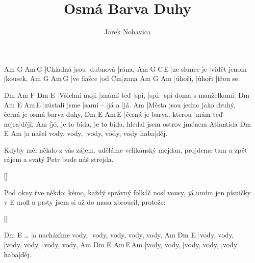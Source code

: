 \documentclass{song}
\author{Jarek Nohavica}
\title{Osmá Barva Duhy}
\begin{document}
\strophe
Am            G        Am\,G
|Chladná jsou |dubnová |rána,
Am            G            C\,E\7
|ze slunce je |vidět jenom |kousek,
Am         G      Am\,G
|ve flašce |od Cin|zana
Am      G      Am
|úhoři, |úhoři |třou se.
\endstrophe

Dm            Am         F     Dm    E\7
|Všichni moji |známí teď |spí, |spí, |spí doma s manželkami,
Dm            Am       E\7   Am\,E\7
|zůstali jsme |sami -- |já a |já.
Am
|Města jsou jedno jako druhý, černá je osmá barva duhy,
Dm                      E\7           Am\,E\7
|černá je barva, kterou |mám teď nejra|ději,
Am
|jó, je to bída, je to bída, hledal jsem ostrov jménem Atlantida
Dm                   E\7                   Am
|a našel vody, vody, |vody, vody, vody haba|děj.
\endstrophe

\strophe*
Kdyby měl někdo z vás zájem,
uděláme velikánský mejdan,
projdeme tam a zpět rájem
a svatý Petr bude náš strejda.
\endstrophe

\ref{}

\strophe*
Pod okny řve někdo: kémo,
každý správný folkáč nosí vousy,
já umím jen písničky v E moll
a prsty jsem si až do masa zbrousil, protože:
\endstrophe

\ref{}

\strophe
         Dm                 E\7
\ldots{} |a nacházíme vody, |vody, vody, vody, vody,
Am           Dm           E\7
|vody, vody, |vody, vody, |vody, vody,
Am           Dm           E\7       Am\,E\7\,Am
|vody, vody, |vody, vody, |vody haba|děj.
\endstrophe
\end{document}
